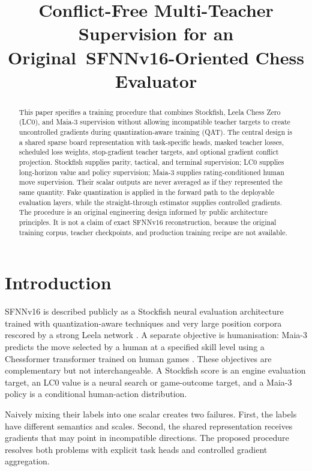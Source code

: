 \documentclass[conference]{IEEEtran}
\title{Conflict-Free Multi-Teacher Supervision for an Original\ SFNNv16-Oriented Chess Evaluator}
\author{\IEEEauthorblockN{Manus AI Research}\IEEEauthorblockA{Unchessed-UCI-Engine\\Clean-room research branch: manus/research-facilities}}
\begin{document}
\maketitle

\begin{abstract}
This paper specifies a training procedure that combines Stockfish, Leela Chess Zero (LC0), and Maia-3 supervision without allowing incompatible teacher targets to create uncontrolled gradients during quantization-aware training (QAT). The central design is a shared sparse board representation with task-specific heads, masked teacher losses, scheduled loss weights, stop-gradient teacher targets, and optional gradient conflict projection. Stockfish supplies parity, tactical, and terminal supervision; LC0 supplies long-horizon value and policy supervision; Maia-3 supplies rating-conditioned human move supervision. Their scalar outputs are never averaged as if they represented the same quantity. Fake quantization is applied in the forward path to the deployable evaluation layers, while the straight-through estimator supplies controlled gradients. The procedure is an original engineering design informed by public architecture principles. It is not a claim of exact SFNNv16 reconstruction, because the original training corpus, teacher checkpoints, and production training recipe are not available.
\end{abstract}

\section{Introduction}
SFNNv16 is described publicly as a Stockfish neural evaluation architecture trained with quantization-aware techniques and very large position corpora rescored by a strong Leela network \cite{sf19}. A separate objective is humanisation: Maia-3 predicts the move selected by a human at a specified skill level using a Chessformer transformer trained on human games \cite{maia3, chessformer}. These objectives are complementary but not interchangeable. A Stockfish score is an engine evaluation target, an LC0 value is a neural search or game-outcome target, and a Maia-3 policy is a conditional human-action distribution.

Naively mixing their labels into one scalar creates two failures. First, the labels have different semantics and scales. Second, the shared representation receives gradients that may point in incompatible directions. The proposed procedure resolves both problems with explicit task heads and controlled gradient aggregation.
\end{document}
